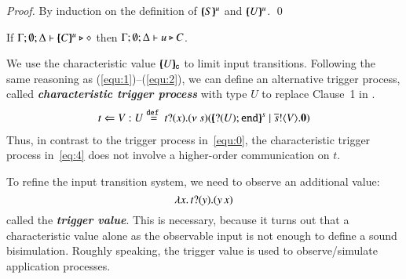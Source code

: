 \begin{proof}
	By induction on the definition of $[\!\!(S)\!\!]^{u}$ and $[\!\!(U)\!\!]^{u}$.
	\qed
\end{proof}

\begin{corollary}\rm
	If $\Gamma; \emptyset; \Delta \vdash [\!\!(C)\!\!]^{u} \triangleright \diamond$
	then
	$\Gamma; \emptyset; \Delta \vdash u \triangleright C$.
\end{corollary}

We use the characteristic value $[\!\!(U)\!\!]_{\mathsf{c}}$
to limit input transitions.
Following the same reasoning as (\ref{equ:1})--(\ref{equ:2}), 
we can define an alternative trigger process, called
{\bf\em characteristic trigger process} with type 
$U$ to replace Clause~1 in .
%
\begin{eqnarray}
	\label{eq:4}
	t \Leftarrow V:U \stackrel{\mathtt{def}\ }{=} t ? (x) . (\nu\ s)([\!\!(? (U) ; \mathtt{end})\!\!]^{s} \;|\; \overline{s} ! \langle V \rangle . \mathbf{0})
\end{eqnarray}
%
\noi 
Thus, in contrast to the trigger process in~\eqref{equ:0},
the characteristic trigger process in~\eqref{eq:4}
does not involve a higher-order communication on $t$.

To refine the input transition system, we need to observe 
an additional value:
%
\[
	\lambda {x}.\,t ? (y) . (y\,{x})
\]
%
called the {\bf\em trigger value}.
This is necessary, because it turns out
that a characteristic value 
alone as the observable input 
is not enough to define a sound bisimulation.
Roughly speaking, the trigger value is used
to observe/simulate application processes.

